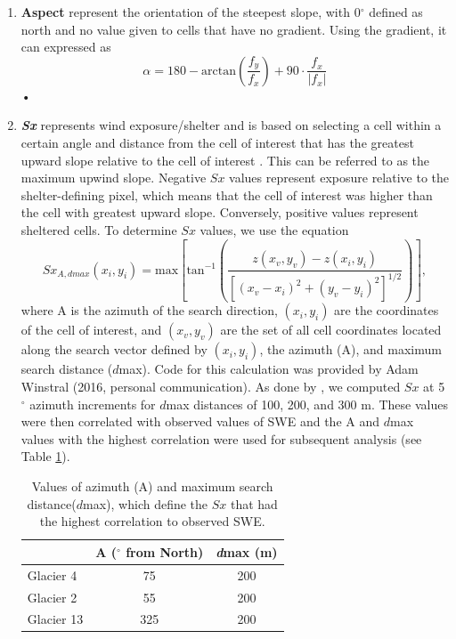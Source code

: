 \documentclass[12pt]{article}
\begin{document}
\begin{enumerate}
\item[] \textbf{Aspect} represent the orientation of the steepest slope, with 0${^\circ}$ defined as north and no value given to cells that have no gradient. Using the gradient, it can expressed as
	\begin{equation}
	\alpha = 180 - \textrm{arctan}\left(\frac{ f_y}{ f_x}\right)+90 \cdot \frac{ f_x}{| f_x|}
	\end{equation}•

\item[] \textbf{\textit{Sx}} represents wind exposure/shelter and is based on selecting a cell within a certain angle and distance from the cell of interest that has the greatest upward slope relative to the cell of interest \citep{Winstral2002}. This can be referred to as the maximum upwind slope. Negative $Sx$ values represent exposure relative to the shelter-defining pixel, which means that the cell of interest was higher than the cell with greatest upward slope. Conversely, positive values represent sheltered cells. To determine $Sx$ values, we use the equation
\begin{equation}
Sx_{A, dmax}(x_i, y_i) = \textrm{max} \left[ \textrm{tan}^{-1} \left( \frac{z(x_v,y_v)-z(x_i,y_i)}{[(x_v-x_i)^2+(y_v-y_i)^2]^{1/2}} \right) \right] ,
\end{equation}
where A is the azimuth of the search direction, $(x_i, y_i)$ are the coordinates of the cell of interest, and $(x_v, y_v)$ are the set of all cell coordinates located along the search vector defined by	$(x_i, y_i)$, the azimuth (A), and maximum search distance ($d$max). Code for this calculation was provided by Adam Winstral (2016, personal communication). As done by \cite{McGrath2015}, we computed $Sx$ at 5$^{\circ}$ azimuth increments for $d$max distances of 100, 200, and 300 m. These values were then correlated with observed values of SWE and the A and $d$max values with the highest correlation were used for subsequent analysis (see Table \ref{tab:Sxparams}). 

\begin{table}[]
\centering
\caption{Values of azimuth (A) and maximum search distance($d$max), which define the $Sx$ that had the highest correlation to observed SWE.}
\label{tab:Sxparams}
\begin{tabular}{lcc}
           & \textbf{A ($^{\circ}$ from North)} & \textbf{\textit{d}max (m)} \\ \hline
Glacier 4  & 75                                & 200                 \\
Glacier 2  & 55                                & 200                 \\
Glacier 13 & 325                            & 200                
\end{tabular}
\end{table}

\end{enumerate}
\end{document}
